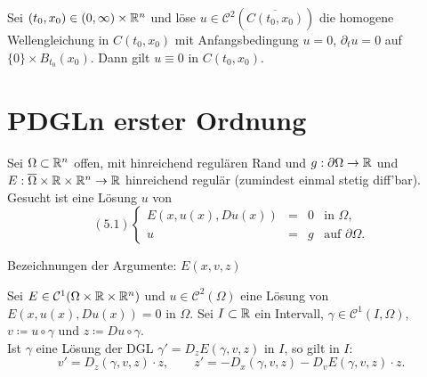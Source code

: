 \documentclass{cheat-sheet}
\begin{document}
\begin{samepage}

\begin{satz}
  Sei $(t_0, x_0) \in \left( 0, \infty \right) \times \mathbb{R}^n$ und löse $u \in \mathcal{C}^2(\overline{C(t_0, x_0)})$ die homogene Wellengleichung in $C(t_0, x_0)$ mit Anfangsbedingung $u = 0$, $\partial_t u = 0$ auf $\{ 0 \} \times B_{t_0}(x_0)$. Dann gilt $u \equiv 0$ in $C(t_0, x_0)$.
\end{satz}


\section{PDGLn erster Ordnung}

\end{samepage}

\begin{prob}
  Sei $\Omega \subset \mathbb{R}^n$ offen, mit hinreichend regulären Rand und $g : \partial \Omega \to \mathbb{R}$ und $E : \overline{\Omega} \times \mathbb{R} \times \mathbb{R}^n \to \mathbb{R}$ hinreichend regulär (zumindest einmal stetig diff'bar). Gesucht ist eine Lösung $u$ von
  \[
    (5.1) \left\{ \begin{array}{llll}
      E(x, u(x), D u(x)) & = & 0 & \text{in } \Omega, \\
      u & = & g & \text{auf } \partial \Omega.
    \end{array} \right.
  \]
\end{prob}

\begin{nota}
  Bezeichnungen der Argumente: $E(x, v, z)$
\end{nota}



\begin{satz}
  Sei $E \in \mathcal{C}^1(\Omega \times \mathbb{R} \times \mathbb{R}^n)$ und $u \in \mathcal{C}^2(\Omega)$ eine Lösung von $E(x, u(x), D u(x)) = 0$ in $\Omega$. Sei $I \subset \mathbb{R}$ ein Intervall, $\gamma \in \mathcal{C}^1(I, \Omega)$, $v \coloneqq u \circ \gamma$ und $z \coloneqq D u \circ \gamma$.\\
  Ist $\gamma$ eine Lösung der DGL $\gamma' = D_z E(\gamma, v, z)$ in $I$, so gilt in $I$:
  \[
    v' = D_z(\gamma, v, z) \cdot z, \qquad
    z' = - D_x(\gamma, v, z) - D_v E(\gamma, v, z) \cdot z.
  \]
\end{satz}
\end{document}
